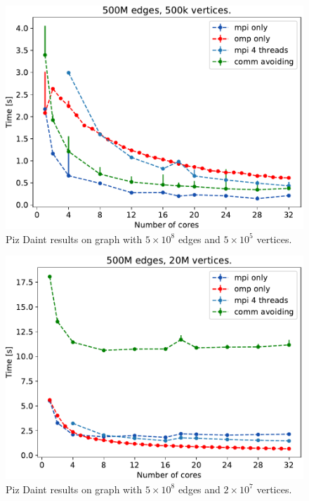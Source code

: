 
\begin{figure}
\includegraphics[width=\fsize]{data/plot_vertices_500k.pdf}
\caption{Piz Daint results on graph with $5\times10^8$ edges and $5\times10^5$ vertices.}
\label{fig:mpi_omp_commavoiding_daint_1}
\end{figure}

\begin{figure}
\includegraphics[width=\fsize]{data/plot_vertices_20M.pdf}
\caption{Piz Daint results on graph with $5\times10^8$ edges and $2\times10^7$ vertices.}
\label{fig:mixed_daint}
\end{figure}

